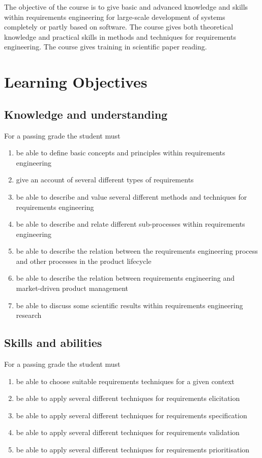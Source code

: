 \documentclass[10pt,a4paper]{article}
\title{\bf\sffamily\fontsize{18}{18}\selectfont{
Course Program\\ ETS170 Requirements Engineering\\http://cs.lth.se/ets170 
}}
\author{\bf\sffamily\fontsize{12}{12}\selectfont{Björn Regnell, Elizabeth Bjarnason}}
\date{\bf\sffamily\fontsize{10}{10}\selectfont{Study period: 20154HT2, Revision date: \today}}
\begin{document}
\maketitle
\noindent 
The objective of the course is to give basic and advanced knowledge and skills within requirements engineering for large-scale development of systems completely or partly based on software. The course gives both theoretical knowledge and practical skills in methods and techniques for requirements engineering. The course gives training in scientific paper reading.

\section{Learning Objectives}
\subsection{Knowledge and understanding}
For a passing grade the student must
\begin{enumerate}[noitemsep]
\item be able to define basic concepts and principles within requirements engineering
\item give an account of several different types of requirements
\item be able to describe and value several different methods and techniques for requirements engineering
\item be able to describe and relate different sub-processes within requirements engineering
\item be able to describe the relation between the requirements engineering process and other processes in the product lifecycle
\item be able to describe the relation between requirements engineering and market-driven product management
\item be able to discuss some scientific results within requirements engineering research
\end{enumerate}


\subsection{Skills and abilities}
For a passing grade the student must
\begin{enumerate}[noitemsep]
\item be able to choose suitable requirements techniques for a given context
\item     be able to apply several different techniques for requirements elicitation
\item     be able to apply several different techniques for requirements specification
\item     be able to apply several different techniques for requirements validation
\item     be able to apply several different techniques for requirements prioritisation
\end{enumerate}
\end{document}
